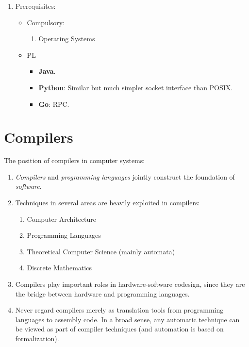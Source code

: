 \documentclass{article}
\begin{document}
\begin{enumerate}
    \item Prerequisites:
    \begin{itemize}
        \item Compulsory:
            \begin{enumerate}
            \item Operating Systems
            \end{enumerate}
        \item PL
        \begin{itemize}
            \item \textbf{Java}.
            \item \textbf{Python}: Similar but much simpler socket interface than POSIX.
            \item \textbf{Go}: RPC.
        \end{itemize}
    \end{itemize}
\end{enumerate}

\section{Compilers}

The position of compilers in computer systems:
\begin{enumerate}
    \item \emph{Compilers} and \emph{programming languages} jointly construct the foundation of \emph{software}.
    \item Techniques in several areas are heavily exploited in compilers:
    \begin{enumerate}
        \item Computer Architecture
        \item Programming Languages
        \item Theoretical Computer Science (mainly automata)
        \item Discrete Mathematics
    \end{enumerate}
    \item Compilers play important roles in hardware-software codesign, since they are the bridge between hardware and programming languages.
    \item Never regard compilers merely as translation tools from programming languages to assembly code. In a broad sense, any automatic technique can be viewed as part of compiler techniques (and automation is based on formalization).
\end{enumerate}
\end{document}

